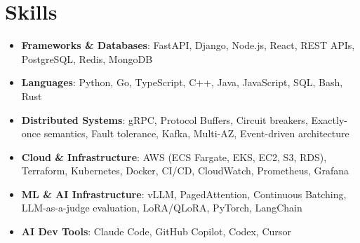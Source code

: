 \documentclass[letterpaper,11pt]{article}
\newcommand{\resumeSubHeadingListStart}{\begin{itemize}[leftmargin=0.15in, label={}]}
\newcommand{\resumeSubHeadingListEnd}{\end{itemize}}
\newcommand{\resumeSkillHeading}[2]{%
  \item\small{\textbf{#1}: #2 \vspace{-9pt}}%
}
\begin{document}
\section{Skills}
  \resumeSubHeadingListStart
    \resumeSkillHeading{Frameworks \& Databases}{FastAPI, Django, Node.js, React, REST APIs, PostgreSQL, Redis, MongoDB}
    \resumeSkillHeading{Languages}{Python, Go, TypeScript, C++, Java, JavaScript, SQL, Bash, Rust}
    \resumeSkillHeading{Distributed Systems}{gRPC, Protocol Buffers, Circuit breakers, Exactly-once semantics, Fault tolerance, Kafka, Multi-AZ, Event-driven architecture}
    \resumeSkillHeading{Cloud \& Infrastructure}{AWS (ECS Fargate, EKS, EC2, S3, RDS), Terraform, Kubernetes, Docker, CI/CD, CloudWatch, Prometheus, Grafana}
    \resumeSkillHeading{ML \& AI Infrastructure}{vLLM, PagedAttention, Continuous Batching, LLM-as-a-judge evaluation, LoRA/QLoRA, PyTorch, LangChain}
    \resumeSkillHeading{AI Dev Tools}{Claude Code, GitHub Copilot, Codex, Cursor}
  \resumeSubHeadingListEnd
\end{document}
